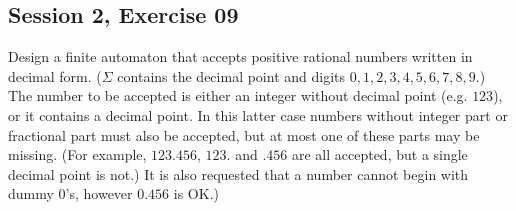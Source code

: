 \subsection{Session 2, Exercise 09}


Design a finite automaton that accepts positive rational numbers written in decimal form. ($\Sigma$ contains the decimal point and digits $0,1,2,3,4,5,6,7,8,9$.) The number to be accepted is either an integer without decimal point (e.g. $123$), or it contains a decimal point. In this latter case numbers without integer part or fractional part must also be accepted, but at most one of these parts may be missing. (For example, $123.456$, $123.$ and $.456$ are all accepted, but a single decimal point is not.) It is also requested that a number cannot begin with dummy $0$'s, however $0.456$ is OK.)

